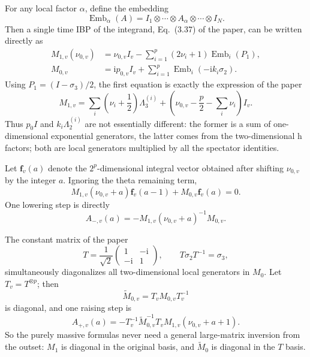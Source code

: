 \documentclass[11pt,a4paper]{article}
\newcommand{\ii}{\mathrm i}
\newcommand{\Emb}{\operatorname{Emb}}
\begin{document}
For any local factor $\alpha$, define the embedding
\begin{equation}
 \Emb_\alpha(A)
 =I_1\otimes\cdots\otimes A_\alpha\otimes\cdots\otimes I_N.
 \label{eq:embedding-definition}
\end{equation}
Then a single time IBP of the integrand, Eq.~(3.37) of the paper, can be written directly as
\begin{align}
 M_{1,v}(\nu_{0,v})
 &=\nu_{0,v}I_v
 -\sum_{i=1}^{p}(2\nu_i+1)\Emb_i(P_1),
 \label{eq:massive-M1-projector}\\
 M_{0,v}
 &=\ii p_{0,v}I_v
 +\sum_{i=1}^{p}\Emb_i(-\ii k_i\sigma_2).
 \label{eq:massive-M0-kronecker}
\end{align}
Using $P_1=(I-\sigma_3)/2$, the first equation is exactly the expression of the paper
\begin{equation}
 M_{1,v}
 =\sum_i\left(\nu_i+\frac12\right)\Lambda_3^{(i)}
 +\left(\nu_{0,v}-\frac p2-\sum_i\nu_i\right)I_v.
\end{equation}
Thus $p_0I$ and $k_i\Lambda_2^{(i)}$ are not essentially different: the former is a sum of one-dimensional exponential generators, the latter comes from the two-dimensional h factors; both are local generators multiplied by all the spectator identities.

Let $\bm f_v(a)$ denote the $2^p$-dimensional integral vector obtained after shifting $\nu_{0,v}$ by the integer $a$. Ignoring the theta remaining term,
\begin{equation}
 M_{1,v}(\nu_{0,v}+a)\bm f_v(a-1)
 +M_{0,v}\bm f_v(a)=0.
 \label{eq:massive-vertex-ibp}
\end{equation}
One lowering step is directly
\begin{equation}
 A_{-,v}(a)
 =-M_{1,v}(\nu_{0,v}+a)^{-1}M_{0,v}.
 \label{eq:Aminus-local}
\end{equation}

The constant matrix of the paper
\begin{equation}
 T=\frac1{\sqrt2}
 \begin{pmatrix}1&-\ii\\-\ii&1\end{pmatrix},
 \qquad
 T\sigma_2T^{-1}=\sigma_3,
 \label{eq:paper-T}
\end{equation}
simultaneously diagonalizes all two-dimensional local generators in $M_0$. Let $T_v=T^{\otimes p}$; then
\begin{equation}
 \widetilde M_{0,v}=T_vM_{0,v}T_v^{-1}
\end{equation}
is diagonal, and one raising step is
\begin{equation}
 A_{+,v}(a)
 =-T_v^{-1}\widetilde M_{0,v}^{-1}T_v
 M_{1,v}(\nu_{0,v}+a+1).
 \label{eq:Aplus-local}
\end{equation}
So the purely massive formulas never need a general large-matrix inversion from the outset: $M_1$ is diagonal in the original basis, and $\widetilde M_0$ is diagonal in the $T$ basis.
\end{document}
